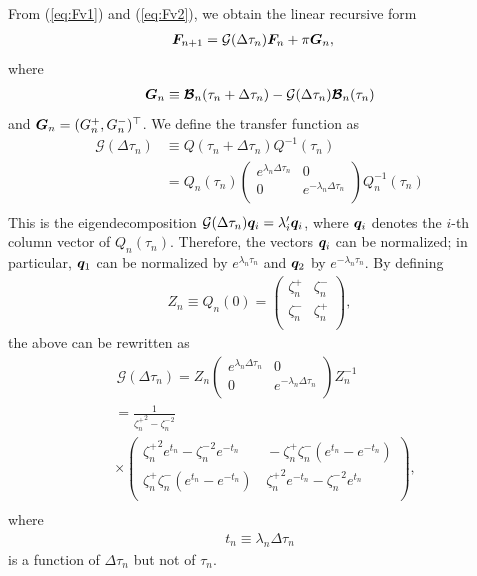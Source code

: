 From (\ref{eq:Fv1}) and (\ref{eq:Fv2}), we obtain the linear recursive form
\begin{align}
    \label{eq:rtstandard}
    \boldsymbol{F}_{n+1} &= \mathcal{G} (\Delta \tau_n) \boldsymbol{F}_n + \pi \boldsymbol{G}_n,
\end{align}
where
\begin{align}
   \boldsymbol{G}_n \equiv \boldsymbol{\mathcal{B}}_n (\tau_n + \Delta \tau_n) - \mathcal{G} (\Delta \tau_n) \boldsymbol{\mathcal{B}}_n (\tau_n)  
\end{align}
and $\boldsymbol{G}_n = (G_n^+, G_n^-)^\top$.
We define the transfer function as
\begin{align}
\label{eq:transfer_matrix}
\mathcal{G} (\Delta \tau_n) &\equiv Q(\tau_n + \Delta \tau_n) Q^{-1}(\tau_n) \\
&=  Q_n(\tau_n)
 \left(
\begin{array}{cc}
e^{\lambda_n \Delta \tau_n}  & 0  \\
0 & e^{-\lambda_n \Delta \tau_n}  \\
\end{array}
\right) Q_n^{-1}(\tau_n) \nonumber \\
\end{align}
This is the eigendecomposition $ \mathcal{G} (\Delta \tau_n) \boldsymbol{q}_i = \lambda^\prime_i \boldsymbol{q}_i$, where $\boldsymbol{q}_i$ denotes the $i$-th column vector of $Q_n(\tau_n)$. Therefore, the vectors $\boldsymbol{q}_i$ can be normalized; in particular, $\boldsymbol{q}_1$ can be normalized by $e^{\lambda_n \tau_n}$ and $\boldsymbol{q}_2$ by $e^{-\lambda_n \tau_n}$. By defining
\begin{align}
    Z_n \equiv Q_n(0) = \left(
\begin{array}{cc}
\zeta^+_n  & \zeta^-_n  \\
\zeta^-_n & \zeta^+_n  \\
\end{array}
\right),
\end{align}
the above can be rewritten as
\begin{align}
\label{eq:transfer_matrix2}
&\,\mathcal{G} (\Delta \tau_n) = 
 Z_n
 \left(
\begin{array}{cc}
e^{\lambda_n \Delta \tau_n}  & 0  \\
0 & e^{-\lambda_n \Delta \tau_n}  \\
\end{array}
\right) Z_n^{-1} \\
\label{eq:gzero}
&= \frac{1}{{\zeta^+_n}^2 - {\zeta^-_n}^2} \nonumber \\
&\times \left(
\begin{array}{cc}
  {\zeta^+_n}^2 e^{t_n} - {\zeta^-_n}^2 e^{-t_n} & \,  - \zeta^+_n \zeta^-_n (e^{t_n} - e^{-t_n}) \\
\zeta^+_n \zeta^-_n (e^{t_n} - e^{-t_n})& \, {\zeta^+_n}^2 e^{-t_n} - {\zeta^-_n}^2 e^{t_n} \\
\end{array}
\right), \nonumber \\
\end{align}
where
\begin{align}
t_n \equiv \lambda_n \Delta \tau_n
\end{align}
is a function of $\Delta \tau_n$ but not of $\tau_n$.

